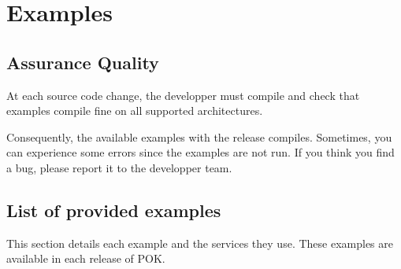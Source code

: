 %
%
%
%
%

\chapter{Examples}

\section{Assurance Quality}
At each source code change, the developper must compile and check that examples
compile fine on all supported architectures.

Consequently, the available examples with the release compiles. Sometimes, you
can experience some errors since the examples are not run. If you think you find
a bug, please report it to the developper team.

\section{List of provided examples}
This section details each example and the services they use.
These examples are available in each release of POK.

